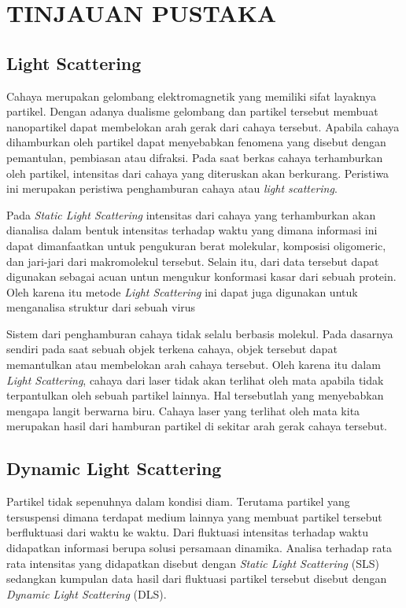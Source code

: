 \chapter{TINJAUAN PUSTAKA}

\section{Light Scattering}
Cahaya merupakan gelombang elektromagnetik yang memiliki sifat layaknya partikel. Dengan adanya
dualisme gelombang dan partikel tersebut membuat nanopartikel dapat membelokan arah gerak dari
cahaya tersebut. Apabila cahaya dihamburkan oleh partikel dapat menyebabkan fenomena yang disebut
dengan pemantulan, pembiasan atau difraksi. Pada saat berkas cahaya terhamburkan oleh partikel,
intensitas dari cahaya yang diteruskan akan berkurang. Peristiwa ini merupakan peristiwa penghamburan
cahaya atau \textit{light scattering}\cite{Black1996}.

Pada \textit{Static Light Scattering} intensitas dari cahaya yang terhamburkan  akan dianalisa dalam
bentuk intensitas terhadap waktu yang dimana informasi ini dapat dimanfaatkan untuk pengukuran berat
molekular, komposisi oligomeric, dan jari-jari dari makromolekul tersebut. Selain itu, dari data
tersebut dapat digunakan sebagai acuan untun mengukur konformasi kasar dari sebuah protein. Oleh
karena itu metode \textit{Light Scattering} ini dapat juga digunakan untuk menganalisa struktur dari
sebuah virus\cite{Stetefeld2016}

Sistem dari penghamburan cahaya tidak selalu berbasis molekul. Pada dasarnya sendiri pada saat
sebuah objek terkena cahaya, objek tersebut dapat memantulkan atau membelokan arah cahaya tersebut.
Oleh karena itu dalam \textit{Light Scattering}, cahaya dari laser tidak akan terlihat oleh mata
apabila tidak terpantulkan oleh sebuah partikel lainnya. Hal tersebutlah yang menyebabkan mengapa
langit berwarna biru. Cahaya laser yang terlihat oleh mata kita merupakan hasil dari hamburan
partikel di sekitar arah gerak cahaya tersebut.



\section{Dynamic Light Scattering}
Partikel tidak sepenuhnya dalam kondisi diam. Terutama partikel yang tersuspensi dimana terdapat
medium lainnya yang membuat partikel tersebut berfluktuasi dari waktu ke waktu. Dari fluktuasi
intensitas terhadap waktu didapatkan informasi berupa solusi persamaan dinamika. Analisa terhadap
rata rata intensitas yang didapatkan disebut dengan \textit{Static Light Scattering} (SLS) sedangkan
kumpulan data hasil dari fluktuasi partikel tersebut disebut dengan \textit{Dynamic Light Scattering}
(DLS).

